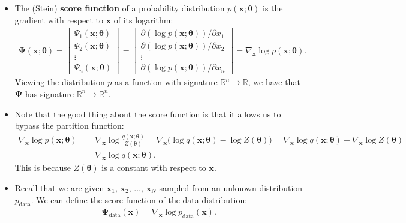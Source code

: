 \documentclass[10pt]{article}
\newcommand{\ve}[1]{\mathbf{#1}}
\newcommand{\mrm}[1]{\mathrm{#1}}
\newcommand{\Real}{\mathbb{R}}
\begin{document}
\begin{itemize}
  \item The (Stein) {\bf score function} of a probability distribution $p(\ve{x};\boldsymbol{\theta})$ is the gradient with respect to $\ve{x}$ of its logarithm:
  \begin{align*}
      \boldsymbol{\Psi}(\ve{x};\boldsymbol{\theta})
      = \begin{bmatrix}
          \Psi_1(\ve{x};\boldsymbol{\theta}) \\
          \Psi_2(\ve{x};\boldsymbol{\theta}) \\
          \vdots \\
          \Psi_n(\ve{x};\boldsymbol{\theta})
      \end{bmatrix}
      = \begin{bmatrix}
          \partial(\log p(\ve{x};\boldsymbol{\theta})) / \partial x_1 \\
          \partial(\log p(\ve{x};\boldsymbol{\theta})) / \partial x_2 \\
          \vdots \\
          \partial(\log p(\ve{x};\boldsymbol{\theta})) / \partial x_n
      \end{bmatrix}
      = \nabla_{\ve{x}} \log p(\ve{x};\boldsymbol{\theta}).
  \end{align*}
  Viewing the distribution $p$ as a function with signature $\Real^n \rightarrow \Real$, we have that $\boldsymbol{\Psi}$ has signature $\Real^n \rightarrow \Real^n$.

  \item Note that the good thing about the score function is that it allows us to bypass the partition function:
  \begin{align*}
      \nabla_{\ve{x}} \log p(\ve{x};\boldsymbol{\theta})
      &= \nabla_{\ve{x}} \log \frac{q(\ve{x};\boldsymbol{\theta})}{Z(\boldsymbol{\theta})}
      = \nabla_{\ve{x}} \big( \log q(\ve{x};\boldsymbol{\theta}) - \log Z(\boldsymbol{\theta}) \big)
      = \nabla_{\ve{x}} \log q(\ve{x};\boldsymbol{\theta}) - \nabla_{\ve{x}} \log Z(\boldsymbol{\theta}) \\
      &= \nabla_{\ve{x}} \log q(\ve{x};\boldsymbol{\theta}).
  \end{align*}
  This is because $Z(\boldsymbol{\theta})$ is a constant with respect to $\ve{x}$.

  \item Recall that we are given $\ve{x}_1$, $\ve{x}_2$, $\dotsc$, $\ve{x}_N$ sampled from an unknown distribution $p_{\mrm{data}}$. We can define the score function of the data distribution:
  \begin{align*}
      \boldsymbol{\Psi}_{\mrm{data}}(\ve{x}) = \nabla_{\ve{x}} \log p_{\mrm{data}}(\ve{x}).
  \end{align*}


\end{itemize}
\end{document}
